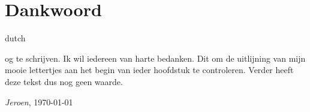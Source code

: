 \chapter*{Dankwoord}
\label{dankwoord}
\fancyhead[RO]{\thepage}
\fancyhead[LE]{\thepage}
\begin{otherlanguage*}{dutch}

\lettrine{}{}og te schrijven. Ik wil iedereen van harte bedanken. Dit om de uitlijning van mijn mooie lettertjes aan het begin van ieder hoofdstuk te controleren. Verder heeft deze tekst dus nog geen waarde.

\hfill \textit{Jeroen}, \today
\end{otherlanguage*}
